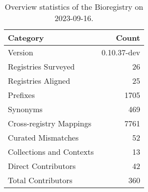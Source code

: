 \begin{table}
\caption{Overview statistics of the Bioregistry on 2023-09-16.}
\label{tab:bioregistry-summary}
\begin{tabular}{lr}
\toprule
Category & Count \\
\midrule
Version & 0.10.37-dev \\
Registries Surveyed & 26 \\
Registries Aligned & 25 \\
Prefixes & 1705 \\
Synonyms & 469 \\
Cross-registry Mappings & 7761 \\
Curated Mismatches & 52 \\
Collections and Contexts & 13 \\
Direct Contributors & 42 \\
Total Contributors & 360 \\
\bottomrule
\end{tabular}
\end{table}
